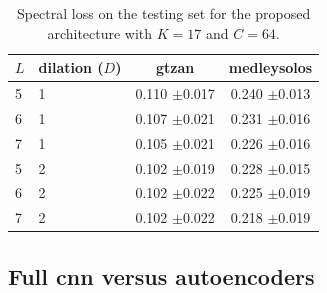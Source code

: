 \documentclass{article}
\begin{document}
\begin{table}[t]
  \begin{center}
\begin{tabular}{llcc}
$L$ & dilation ($D$) & gtzan & medleysolos \\
\hline
5 & 1 & 0.110 $\pm$0.017 & 0.240 $\pm$0.013 \\
6 & 1 & 0.107 $\pm$0.021 & 0.231 $\pm$0.016 \\
7 & 1 & 0.105 $\pm$0.021 & 0.226 $\pm$0.016 \\
5 & 2 & 0.102 $\pm$0.019 & 0.228 $\pm$0.015 \\
6 & 2 & 0.102 $\pm$0.022 & 0.225 $\pm$0.019 \\
7 & 2 & 0.102 $\pm$0.022 & 0.218 $\pm$0.019 \\
\end{tabular}
\caption{Spectral loss on the testing set for the proposed architecture with $K=17$ and $C=64$.}
\label{tab:lvsd}
\end{center}
\vspace{-4mm}
\end{table}






\subsection*{Full cnn versus autoencoders}
\end{document}
